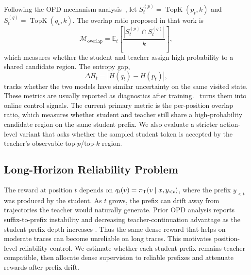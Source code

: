Following the OPD mechanism analysis~\citep{li2026rethinking}, let $S_t^{(p)}=\operatorname{TopK}(p_t,k)$ and $S_t^{(q)}=\operatorname{TopK}(q_t,k)$.
The overlap ratio proposed in that work is
\begin{equation}
    \mathcal{M}_{\mathrm{overlap}}
    =
    \mathbb{E}_{t}\left[
        \frac{|S_t^{(p)}\cap S_t^{(q)}|}{k}
    \right],
    \label{eq:overlap-ratio}
\end{equation}
which measures whether the student and teacher assign high probability to a shared candidate region.
The entropy gap,
\begin{equation}
    \Delta H_t = |H(q_t)-H(p_t)|,
    \label{eq:entropy-gap}
\end{equation}
tracks whether the two models have similar uncertainty on the same visited state.
These metrics are usually reported as diagnostics after training.
\method~turns them into online control signals.
The current primary metric is the per-position overlap ratio, which measures whether student and teacher still share a high-probability candidate region on the same student prefix.
We also evaluate a stricter action-level variant that asks whether the sampled student token is accepted by the teacher's observable top-$p$/top-$k$ region.

\subsection{Long-Horizon Reliability Problem}

The reward at position $t$ depends on $q_t(v)=\pi_{\mathrm{T}}(v\mid x,y_{<t})$, where the prefix $y_{<t}$ was produced by the student.
As $t$ grows, the prefix can drift away from trajectories the teacher would naturally generate.
Prior OPD analysis reports suffix-to-prefix instability and decreasing teacher-continuation advantage as the student prefix depth increases \citep{li2026rethinking}.
Thus the same dense reward that helps on moderate traces can become unreliable on long traces. This motivates position-level reliability control.
We estimate whether each student prefix remains teacher-compatible, then allocate dense supervision to reliable prefixes and attenuate rewards after prefix drift.
